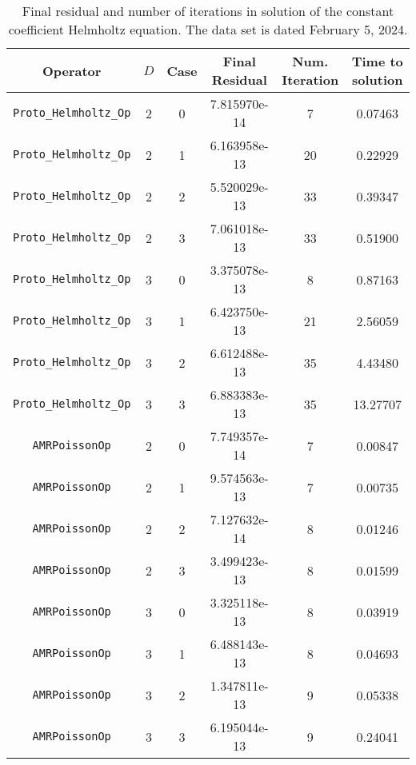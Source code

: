 \documentclass{article}
\begin{document}
\begin{small}
\begin{table}
\begin{center}
\begin{tabular}{|c|c|c|c|c||c|} \hline
 Operator                   & $D$ & Case & Final Residual &
 Num. Iteration & Time to solution\\
\hline
 {\tt Proto\_Helmholtz\_Op}       & 2   & 0    &   7.815970e-14 &         7  & 0.07463  \\
 {\tt Proto\_Helmholtz\_Op}       & 2   & 1    &   6.163958e-13 &         20 & 0.22929  \\
 {\tt Proto\_Helmholtz\_Op}       & 2   & 2    &   5.520029e-13 &         33 & 0.39347  \\
 {\tt Proto\_Helmholtz\_Op}       & 2   & 3    &   7.061018e-13 &         33 & 0.51900  \\
 {\tt Proto\_Helmholtz\_Op}       & 3   & 0    &   3.375078e-13 &         8  & 0.87163  \\
 {\tt Proto\_Helmholtz\_Op}       & 3   & 1    &   6.423750e-13 &         21 & 2.56059  \\
 {\tt Proto\_Helmholtz\_Op}       & 3   & 2    &   6.612488e-13 &         35 & 4.43480  \\
 {\tt Proto\_Helmholtz\_Op}       & 3   & 3    &   6.883383e-13 &         35 & 13.27707 \\
 \hline                                                                       
 {\tt AMRPoissonOp}               & 2   & 0    &   7.749357e-14 &         7  & 0.00847\\
 {\tt AMRPoissonOp}               & 2   & 1    &   9.574563e-13 &         7  & 0.00735\\
 {\tt AMRPoissonOp}               & 2   & 2    &   7.127632e-14 &         8  & 0.01246\\
 {\tt AMRPoissonOp}               & 2   & 3    &   3.499423e-13 &         8  & 0.01599\\
 {\tt AMRPoissonOp}               & 3   & 0    &   3.325118e-13 &         8  & 0.03919\\
 {\tt AMRPoissonOp}               & 3   & 1    &   6.488143e-13 &         8  & 0.04693\\
 {\tt AMRPoissonOp}               & 3   & 2    &   1.347811e-13 &         9  & 0.05338\\
 {\tt AMRPoissonOp}               & 3   & 3    &   6.195044e-13 &         9  & 0.24041\\
\hline
\end{tabular}
\end{center}
\label{tab::helmholtz1}
\caption
    {
      Final residual and number of iterations in solution of the  constant
      coefficient Helmholtz equation.
      The data set is dated February 5, 2024.
    }
\end{table}
\end{small}
\end{document}
